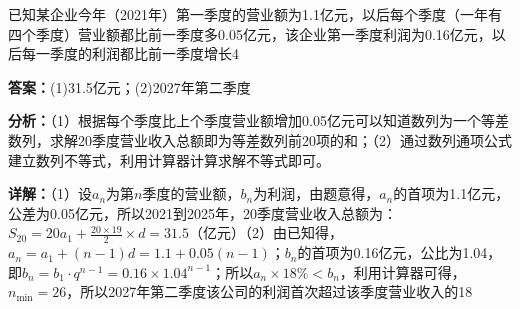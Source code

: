 \begin{question}[points=14]
已知某企业今年（2021年）第一季度的营业额为1.1亿元，以后每个季度（一年有四个季度）营业额都比前一季度多0.05亿元，该企业第一季度利润为0.16亿元，以后每一季度的利润都比前一季度增长4%
\begin{solution}
\textbf{答案：}(1)31.5亿元；(2)2027年第二季度

\textbf{分析：}（1）根据每个季度比上个季度营业额增加0.05亿元可以知道数列为一个等差数列，求解20季度营业收入总额即为等差数列前20项的和；（2）通过数列通项公式建立数列不等式，利用计算器计算求解不等式即可。

\textbf{详解：}（1）设$a_n$为第$n$季度的营业额，$b_n$为利润，由题意得，$a_n$的首项为1.1亿元，公差为0.05亿元，所以2021到2025年，20季度营业收入总额为：$S_{20}=20a_1+\frac{20\times19}{2}\times d=31.5$（亿元）（2）由已知得，$a_n=a_1+(n-1)d=1.1+0.05(n-1)$；$b_n$的首项为0.16亿元，公比为1.04，即$b_n=b_1\cdot q^{n-1}=0.16\times1.04^{n-1}$；所以$a_n\times18\%<b_n$，利用计算器可得，$n_{\min}=26$，所以2027年第二季度该公司的利润首次超过该季度营业收入的18%
\end{solution}
\end{question}

